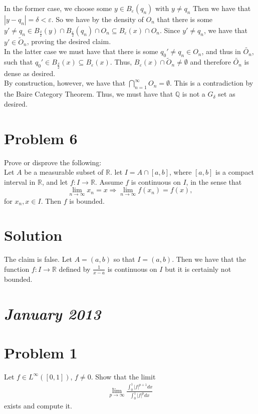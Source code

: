 \documentclass{article}
\begin{document}
\noindent In the former case, we choose some $y\in B_\varepsilon(q_n)$ with $y\neq q_n$  Then we have that $|y-q_n|=\delta<\varepsilon$.  So we have by the density of $O_n$ that there is some $y'\neq q_n\in B_{\frac{\delta}{2}}(y)\cap B_{\frac{\varepsilon}{2}}(q_n)\cap O_n\subseteq B_\varepsilon(x)\cap O_n$.  Since $y'\neq q_n$, we have that $y'\in\tilde{O}_n$, proving the desired claim.\\
 
\noindent In the latter case we must have that there is some $q_0'\neq q_n\in O_n$, and thus in $\tilde{O_n}$, such that $q_0'\in B_{\frac{\delta}{2}}(x)\subseteq B_\varepsilon(x)$.  Thus, $B_\varepsilon(x)\cap\tilde{O}_n\neq\emptyset$ and therefore $\tilde{O_n}$ is dense as desired.\\

\noindent By construction, however, we have that $\bigcap_{n=1}^\infty O_n=\emptyset$.  This is a contradiction by the Baire Category Theorem.  Thus, we must have that $\mathbb{Q}$ is not a $G_\delta$ set as desired.

\section*{Problem 6}
Prove or disprove the following:\\

\noindent Let $A$ be a measurable subset of $\mathbb{R}$. let $I=A\cap[a,b]$, where $[a,b]$ is a compact interval in $\mathbb{R}$, and let $f:I\rightarrow\mathbb{R}$.  Assume $f$ is continuous on $I$, in the sense that $$\lim_{n\rightarrow\infty}x_n=x\Rightarrow\lim_{n\rightarrow\infty}f(x_n)=f(x),$$ for $x_n,x\in I$.  Then $f$ is bounded.

\section*{Solution}
The claim is false.  Let $A=(a,b)$ so that $I=(a,b)$.  Then we have that the function $f:I\rightarrow\mathbb{R}$ defined by $\frac{1}{x-a}$ is continuous on $I$ but it is certainly not bounded.

\section*{{\it January 2013}}

\section*{Problem 1}
Let $f\in L^\infty([0,1])$, $f\neq 0$.  Show that the limit
\begin{align*}
\lim_{p\rightarrow\infty}\frac{\int_0^1|f|^{p+1}dx}{\int_0^1|f|^pdx}
\end{align*}
exists and compute it.
\end{document}
